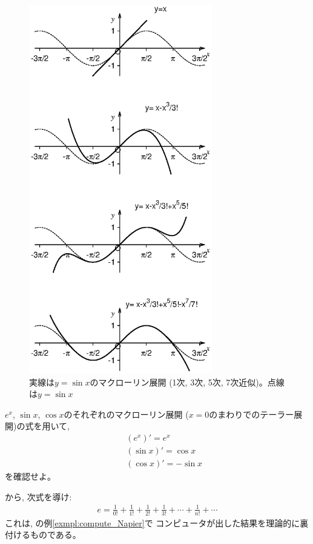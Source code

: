 \begin{figure}[h]
    \centering
    \includegraphics[width=8cm]{Taylor_sin.eps}
    \caption{実線は$y=\sin x$のマクローリン展開 (1次, 3次, 5次, 7次近似)。点線は$y=\sin x$}
\end{figure}

\begin{q}\label{q:univ_Taylor2} $e^x$, $\sin x$, $\cos x$のそれぞれのマクローリン展開
($x=0$のまわりでのテーラー展開)の式を用いて, 
\begin{eqnarray*}
&&(e^x)'=e^x\\
&&(\sin x)'=\cos x\\
&&(\cos x)'=-\sin x
\end{eqnarray*}
を確認せよ。
\end{q}\vspace{0.3cm}

\begin{q}\label{q:Taylor_Napier} から, 次式を導け:
\begin{eqnarray}
e=\frac{1}{0!}+\frac{1}{1!}+\frac{1}{2!}+\frac{1}{3!}+\cdots+\frac{1}{n!}+\cdots\label{q:compute_Napier_again}
\end{eqnarray}
これは, の例\ref{exmpl:compute_Napier}で
コンピュータが出した結果を理論的に裏付けるものである。\end{q}\mv


